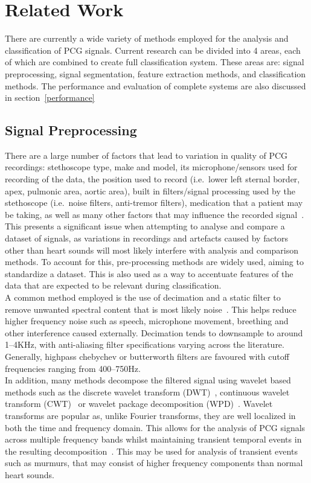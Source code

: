 \documentclass[titlepage, 12pt]{scrartcl} \usepackage{enumitem}
\begin{document}
\section{Related Work}
There are currently a wide variety of methods employed for the analysis and
classification of PCG signals. Current research can be divided into 4 areas,
each of which are combined to create full classification system. These areas
are: signal preprocessing, signal segmentation, feature extraction methods,
and classification methods.
The performance and evaluation of complete systems are also discussed in
section~\ref{performance}


\subsection{Signal Preprocessing}
There are a large number of factors that lead to variation in quality of PCG
recordings: stethoscope type, make and model, its microphone/sensors used for
recording of the data, the position used to record (i.e.\ lower left sternal
border, apex, pulmonic area, aortic area), built in filters/signal processing
used by the stethoscope (i.e.\ noise filters, anti-tremor filters), medication that
a patient may be taking, as well as many other factors that may influence the
recorded signal~\parencite[p.4]{Pavlopoulos2004}. This presents a significant
issue when attempting to analyse and compare a dataset of signals, as
variations in recordings and artefacts caused by factors other than heart
sounds will most likely interfere with analysis and comparison methods. To
account for this, pre-processing methods are widely used, aiming to standardize
a dataset. This is also used as a way to accentuate features of the data that
are expected to be relevant during classification.\\

A common method employed is the use of decimation and a static filter to remove
unwanted spectral content that is most likely noise~\parencite{Liang1997a,
Homsi2016, Springer2016, Gupta2007}. This helps reduce higher frequency noise
such as speech, microphone movement, breething and other interference caused
externally.  Decimation tends to downsample to around 1--4KHz, with
anti-aliasing filter specifications varying across the literature. Generally,
highpass chebychev or butterworth filters are favoured with cutoff frequencies
ranging from 400--750Hz.\\

In addition, many methods decompose the filtered signal using wavelet based
methods such as the discrete wavelet transform
(DWT)~\parencite{Liang1997a, Pavlopoulos2004}, continuous
wavelet transform (CWT)~\parencite{Langley2016} or wavelet
package decomposition (WPD)~\parencite{Liang1998}.
Wavelet transforms are popular as, unlike Fourier transforms, they are well
localized in both the time and frequency domain. This allows for the analysis
of PCG signals across multiple frequency bands whilst maintaining transient
temporal events in the resulting decomposition~\parencite[p.93]{Ari2008}.
This may be used for analysis of transient events such as murmurs, that may
consist of higher frequency components than normal heart sounds.
\end{document}
